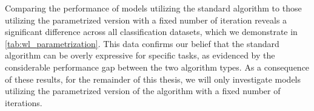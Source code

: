 Comparing the performance of \wlnn models utilizing the standard \wl algorithm to those utilizing the parametrized version with a fixed number of \wl iteration reveals a significant difference across all classification datasets, which we demonstrate in \cref{tab:wl_parametrization}. This data confirms our belief that the standard \wl algorithm can be overly expressive for specific tasks, as evidenced by the considerable performance gap between the two algorithm types. As a consequence of these results, for the remainder of this thesis, we will only investigate \wlnn models utilizing the parametrized version of the \wl algorithm with a fixed number of iterations.

\begin{table}[htb]
	\caption{Comparison between the best performing \wlnn models using the standard or the paraemetrized \wl algorithm in percent and standard deviation. Additionally, we included the average number of iterations for the standard version and the optimal fixed number of iterations for the parametrized version of the \wl algorithm.}
	\label{tab:wl_parametrization}
\end{table}

